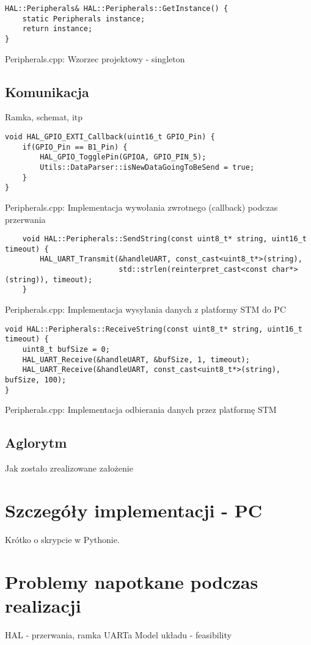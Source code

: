 \begin{listing}[htb]
\begin{verbatim}
HAL::Peripherals& HAL::Peripherals::GetInstance() {
    static Peripherals instance;
    return instance;
}
\end{verbatim}
\caption{Peripherals.cpp: Wzorzec projektowy - singleton}
\label{lst:singleton_cpp}
\end{listing}

\subsection{Komunikacja} \label{sec:uart}
Ramka, schemat, itp
\begin{listing}[htb]
\begin{verbatim}
void HAL_GPIO_EXTI_Callback(uint16_t GPIO_Pin) {
    if(GPIO_Pin == B1_Pin) {
        HAL_GPIO_TogglePin(GPIOA, GPIO_PIN_5);
        Utils::DataParser::isNewDataGoingToBeSend = true;
    }
}
\end{verbatim}
\caption{Peripherals.cpp: Implementacja wywołania zwrotnego (callback) podczas przerwania}
\label{lst:callback_cpp}
\end{listing}

\begin{listing}[htb]
\begin{verbatim}
    void HAL::Peripherals::SendString(const uint8_t* string, uint16_t timeout) {
        HAL_UART_Transmit(&handleUART, const_cast<uint8_t*>(string),
                          std::strlen(reinterpret_cast<const char*>(string)), timeout);
    }
    \end{verbatim}
    \caption{Peripherals.cpp: Implementacja wysyłania danych z platformy STM do PC}
    \label{lst:sendstring_cpp}
\end{listing}

\begin{listing}[htb]
\begin{verbatim}
void HAL::Peripherals::ReceiveString(const uint8_t* string, uint16_t timeout) {
    uint8_t bufSize = 0;
    HAL_UART_Receive(&handleUART, &bufSize, 1, timeout);
    HAL_UART_Receive(&handleUART, const_cast<uint8_t*>(string), bufSize, 100);
}
\end{verbatim}
\caption{Peripherals.cpp: Implementacja odbierania danych przez platformę STM}
\label{lst:sendstring_cpp}
\end{listing}


\subsection{Aglorytm} \label{sec:algorithm}
Jak zostało zrealizowane założenie

\section{Szczegóły implementacji - PC} \label{sec:details-pc}
Krótko o skrypcie w Pythonie.

\section{Problemy napotkane podczas realizacji} \label{sec:problems}
HAL - przerwania, ramka UARTa
Model układu - feasibility
